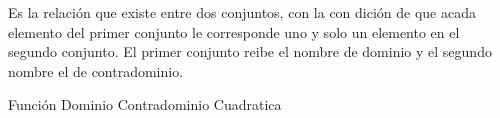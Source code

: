 
\question Es la relación que existe entre dos conjuntos, con la con dición
de que acada elemento del primer conjunto le corresponde uno y solo un
elemento en el segundo conjunto. El primer conjunto reibe el nombre de
dominio y el segundo nombre el de contradominio. 

  \begin{oneparchoices}
    \CorrectChoice Función
    \choice Dominio
    \choice Contradominio
    \choice Cuadratica
  \end{oneparchoices}
